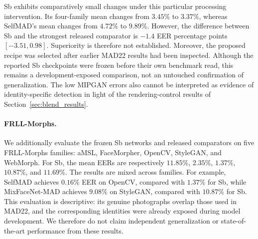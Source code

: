 



Sb exhibits comparatively small changes under
this particular processing intervention.
Its four-family mean changes from $3.45\%$
to $3.37\%$, whereas SelfMAD's mean changes
from $4.72\%$ to $9.89\%$.
However, the difference between Sb and the strongest
released comparator is $-1.4$ EER percentage
points%
$[-3.51,0.98]$.
Superiority is therefore not established.
%
Moreover, the proposed recipe was selected after
earlier MAD22 results had been inspected.
Although the reported Sb checkpoints were frozen
before their own benchmark read, this remains a
development-exposed comparison, not an untouched
confirmation of generalization.
%
The low MIPGAN errors also cannot be interpreted
as evidence of identity-specific detection in
light of the rendering-control results of
Section~\ref{sec:blend_results}.

\paragraph{FRLL-Morphs.}
We additionally evaluate the frozen Sb networks
and released comparators on five FRLL-Morphs
families: aMSL, FaceMorpher, OpenCV, StyleGAN,
and WebMorph.
For Sb, the mean EERs are respectively
$11.85\%$, $2.35\%$, $1.37\%$, $10.87\%$,
and $11.69\%$.
The results are mixed across families.
For example, SelfMAD achieves $0.16\%$ EER
on OpenCV, compared with $1.37\%$ for Sb,
while MixFaceNet-MAD achieves $9.08\%$
on StyleGAN, compared with $10.87\%$ for Sb.
This evaluation is descriptive: its genuine
photographs overlap those used in MAD22,
and the corresponding identities were already
exposed during model development.
We therefore do not claim independent generalization
or state-of-the-art performance from these results.

